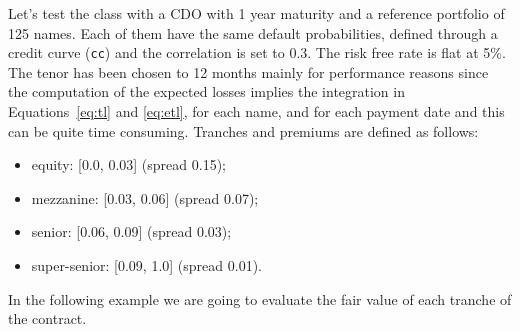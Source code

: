 Let's test the class with a CDO with 1 year maturity and a reference portfolio of 125 names. Each of them have the same default probabilities, defined through a credit curve (\texttt{cc}) and the correlation is set to 0.3. The risk free rate is flat at 5\%. The tenor has been chosen to 12 months mainly for performance reasons since the computation of the expected losses implies the integration in Equations~\ref{eq:tl} and \ref{eq:etl}, for each name, and for each payment date and this can be quite time consuming.
Tranches and premiums are defined as follows:
\begin{itemize}
	\item equity: [0.0, 0.03] (spread 0.15);
	\item mezzanine: [0.03, 0.06] (spread 0.07);
	\item senior: [0.06, 0.09] (spread 0.03);
	\item super-senior: [0.09, 1.0] (spread 0.01).
\end{itemize}

In the following example we are going to evaluate the fair value of each tranche of the contract.

